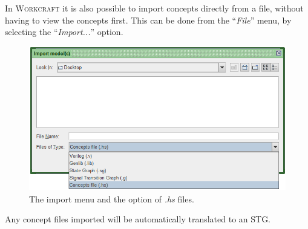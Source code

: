 \documentclass[british,conference,compsoc]{IEEEtran}
\newcommand{\noun}[1]{\textsc{#1}}
\begin{document}
\vspace{-2mm}

In \noun{Workcraft} it is also possible to import concepts directly from a file,
without having to view the concepts first. This can be done from the 
``\emph{File}'' menu, by selecting the ``\emph{Import...}'' option. 

\begin{figure}[h]
\begin{centering}
\vspace{-3mm}
\includegraphics[scale=0.4]{Images/import_menu_screenshot.png}
\par\end{centering}

\begin{centering}
\protect\caption{\label{fig:import_menu_screenshot}The import menu and the 
			option of \emph{.hs} files.}

\par\end{centering}
\vspace{-3mm}
\end{figure}

Any concept files imported will be automatically translated to an STG.

\vspace{-3mm}

%
%
%
\end{document}
